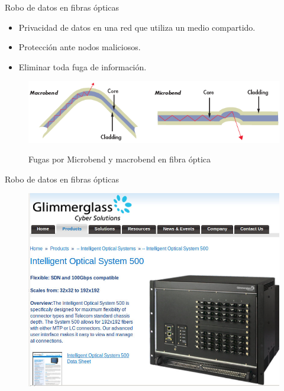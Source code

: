 \documentclass[aspectratio=169]{beamer}
\begin{document}
\begin{frame}{Robo de datos en fibras ópticas}

\begin{itemize}
 \item Privacidad de datos en una red que utiliza un medio compartido.
 \item Protección ante nodos maliciosos. 
 \item Eliminar toda fuga de información.
 \end{itemize}

 \begin{figure}[t]
  \centering
  \includegraphics[width=0.75 \textwidth]{graphs/microbend.png}
  
  Fugas por Microbend y macrobend en fibra óptica \cite{jay2010}
\end{figure}

\end{frame}




\begin{frame}{Robo de datos en fibras ópticas}
\begin{figure}[t]
  \centering
  \includegraphics[width=0.75 \textwidth]{graphs/glimmer1.jpg} 
\end{figure}
\end{frame}

\end{document}
